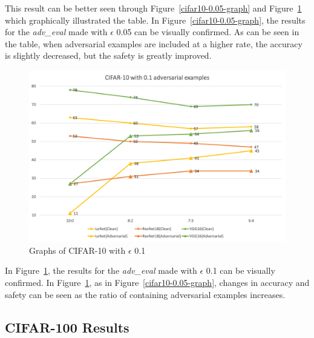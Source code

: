 \documentclass[journal,article,submit,moreauthors,pdftex]{Definitions/mdpi}
\begin{document}
This result can be better seen through Figure~\ref{cifar10-0.05-graph} and Figure~\ref{cifar10-0.1-graph} which graphically illustrated the table.
In Figure~\ref{cifar10-0.05-graph}, the results for the {\it adv\_eval} made with \begin{math}\epsilon\end{math} 0.05 can be visually confirmed.
As can be seen in the table, when adversarial examples are included at a higher rate, the accuracy is slightly decreased, but the safety is greatly improved.

\begin{figure}[H]
    \includegraphics[width=13 cm]{Definitions/graph-01cifar10.png}
    \caption{Graphs of CIFAR-10 with \begin{math}\epsilon\end{math} 0.1\label{cifar10-0.1-graph}}
\end{figure}

In Figure~\ref{cifar10-0.1-graph}, the results for the {\it adv\_eval} made with \begin{math}\epsilon\end{math} 0.1 can be visually confirmed.
In Figure~\ref{cifar10-0.1-graph}, as in Figure~\ref{cifar10-0.05-graph}, changes in accuracy and safety can be seen as the ratio of containing adversarial examples increases.

\subsection{CIFAR-100 Results}
\end{document}
